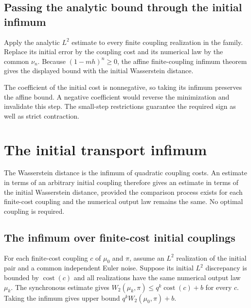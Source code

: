 \documentclass[11pt,a4paper]{article}
\begin{document}
\subsection{\texorpdfstring{Passing the analytic bound through the initial infimum}{Passing the analytic bound through the initial infimum}}


Apply the analytic \(L^2\) estimate to every finite coupling realization in the family. Replace its initial error by the coupling cost and its numerical law by the common \(\nu_n\). Because \((1-mh)^n\ge0\), the affine finite-coupling infimum theorem gives the displayed bound with the initial Wasserstein distance.



The coefficient of the initial cost is nonnegative, so taking its infimum preserves the affine bound. A negative coefficient would reverse the minimization and invalidate this step. The small-step restrictions guarantee the required sign as well as strict contraction.


\section{\texorpdfstring{The initial transport infimum}{The initial transport infimum}}


The Wasserstein distance is the infimum of quadratic coupling costs. An estimate in terms of an arbitrary initial coupling therefore gives an estimate in terms of the initial Wasserstein distance, provided the comparison process exists for each finite-cost coupling and the numerical output law remains the same. No optimal coupling is required.



\subsection{\texorpdfstring{The infimum over finite-cost initial couplings}{The infimum over finite-cost initial couplings}}


For each finite-cost coupling \(c\) of \(\mu_0\) and \(\pi\), assume an \(L^2\) realization of the initial pair and a common independent Euler noise. Suppose its initial \(L^2\) discrepancy is bounded by \(\operatorname{cost}(c)\) and all realizations have the same numerical output law \(\mu_k\). The synchronous estimate gives \(W_2(\mu_k,\pi)\le q^k\operatorname{cost}(c)+b\) for every \(c\). Taking the infimum gives upper bound \(q^kW_2(\mu_0,\pi)+b\).
\end{document}
